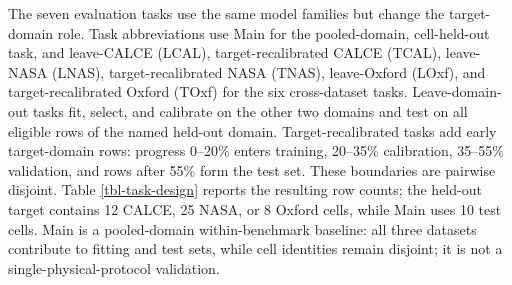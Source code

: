 \documentclass[
  number,
  preprint]{elsarticle}
\begin{document}
\begin{table}

\caption{\label{tbl-datasets}Real battery datasets after preprocessing. Rows are source/eligible; every eligible row has an earlier same-cell SOH record.}


\end{table}%

The seven evaluation tasks use the same model families but change the
target-domain role. Task abbreviations use Main for the pooled-domain,
cell-held-out task, and leave-CALCE (LCAL), target-recalibrated CALCE
(TCAL), leave-NASA (LNAS), target-recalibrated NASA (TNAS), leave-Oxford
(LOxf), and target-recalibrated Oxford (TOxf) for the six cross-dataset
tasks. Leave-domain-out tasks fit, select, and calibrate on the other
two domains and test on all eligible rows of the named held-out domain.
Target-recalibrated tasks add early target-domain rows: progress 0--20\%
enters training, 20--35\% calibration, 35--55\% validation, and rows
after 55\% form the test set. These boundaries are pairwise disjoint.
Table \ref{tbl-task-design} reports the resulting row counts; the
held-out target contains 12 CALCE, 25 NASA, or 8 Oxford cells, while
Main uses 10 test cells. Main is a pooled-domain within-benchmark
baseline: all three datasets contribute to fitting and test sets, while
cell identities remain disjoint; it is not a single-physical-protocol
validation.
\end{document}
